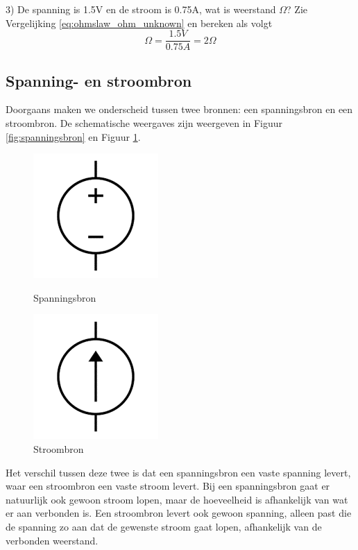 3) De spanning is 1.5V en de stroom is 0.75A, wat is weerstand $\Omega$? Zie Vergelijking \ref{eq:ohmslaw_ohm_unknown} en bereken als volgt
\begin{equation}
	\Omega = \frac{1.5V}{0.75A} = 2 \Omega
\end{equation}

\subsection{Spanning- en stroombron}
Doorgaans maken we onderscheid tussen twee bronnen: een spanningsbron en een stroombron. De schematische weergaves zijn weergeven in Figuur \ref{fig:spanningsbron} en Figuur \ref{fig:stroombron}.

\begin{figure}[H]
	\begin{minipage}{0.45\textwidth}
		\centering
		\includegraphics[scale=0.5]{./img/spanningsbron.png}
		\caption{Spanningsbron}
		\label{fig:spanningsbron}
	\end{minipage}
	\hfill
	\begin{minipage}{0.45\textwidth}
		\centering
		\includegraphics[scale=0.5]{./img/stroombron.png}
		\caption{Stroombron}
		\label{fig:stroombron}
	\end{minipage}
\end{figure}


Het verschil tussen deze twee is dat een spanningsbron een vaste spanning levert, waar een stroombron een vaste stroom levert. Bij een spanningsbron gaat er natuurlijk ook gewoon stroom lopen, maar de hoeveelheid is afhankelijk van wat er aan verbonden is. Een stroombron levert ook gewoon spanning, alleen past die de spanning zo aan dat de gewenste stroom gaat lopen, afhankelijk van de verbonden weerstand. \\

